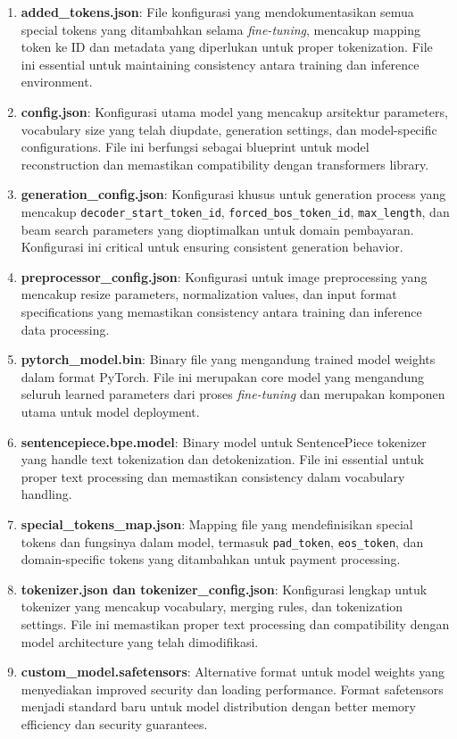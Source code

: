 \begin{enumerate}
\item \textbf{added\_tokens.json}: File konfigurasi yang mendokumentasikan semua special tokens yang ditambahkan selama \emph{fine-tuning}, mencakup mapping token ke ID dan metadata yang diperlukan untuk proper tokenization. File ini essential untuk maintaining consistency antara training dan inference environment.

\item \textbf{config.json}: Konfigurasi utama model yang mencakup arsitektur parameters, vocabulary size yang telah diupdate, generation settings, dan model-specific configurations. File ini berfungsi sebagai blueprint untuk model reconstruction dan memastikan compatibility dengan transformers library.

\item \textbf{generation\_config.json}: Konfigurasi khusus untuk generation process yang mencakup \texttt{decoder\_start\_token\_id}, \texttt{forced\_bos\_token\_id}, \texttt{max\_length}, dan beam search parameters yang dioptimalkan untuk domain pembayaran. Konfigurasi ini critical untuk ensuring consistent generation behavior.

\item \textbf{preprocessor\_config.json}: Konfigurasi untuk image preprocessing yang mencakup resize parameters, normalization values, dan input format specifications yang memastikan consistency antara training dan inference data processing.

\item \textbf{pytorch\_model.bin}: Binary file yang mengandung trained model weights dalam format PyTorch. File ini merupakan core model yang mengandung seluruh learned parameters dari proses \emph{fine-tuning} dan merupakan komponen utama untuk model deployment.

\item \textbf{sentencepiece.bpe.model}: Binary model untuk SentencePiece tokenizer yang handle text tokenization dan detokenization. File ini essential untuk proper text processing dan memastikan consistency dalam vocabulary handling.

\item \textbf{special\_tokens\_map.json}: Mapping file yang mendefinisikan special tokens dan fungsinya dalam model, termasuk \texttt{pad\_token}, \texttt{eos\_token}, dan domain-specific tokens yang ditambahkan untuk payment processing.

\item \textbf{tokenizer.json dan tokenizer\_config.json}: Konfigurasi lengkap untuk tokenizer yang mencakup vocabulary, merging rules, dan tokenization settings. File ini memastikan proper text processing dan compatibility dengan model architecture yang telah dimodifikasi.

\item \textbf{custom\_model.safetensors}: Alternative format untuk model weights yang menyediakan improved security dan loading performance. Format safetensors menjadi standard baru untuk model distribution dengan better memory efficiency dan security guarantees.
\end{enumerate}

